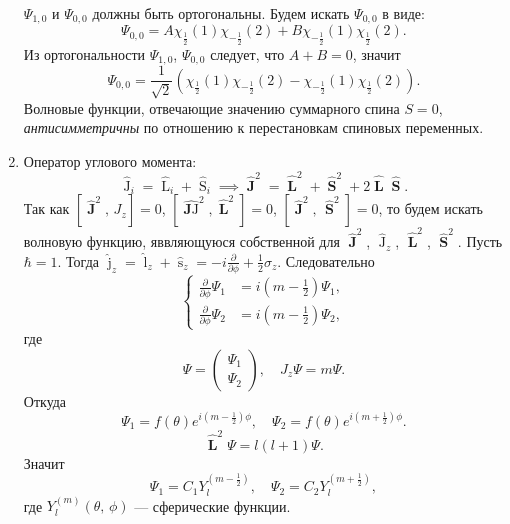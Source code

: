 \documentclass[a4paper]{article}
\begin{document}
\begin{sol}
\begin{enumerate}
$\Psi_{1,0}$ и $\Psi_{0,0}$ должны быть
ортогональны. Будем искать $\Psi_{0,0}$ в виде:
\[
	\Psi_{0,0}= A \chi_{\frac{1}{2}}(1)\chi_{-\frac{1}{2}}(2)+B\chi_{-\frac{1}{2}}(1)\chi_{\frac{1}{2}}(2)
.\] 
Из ортогональности $\Psi_{1,0}$, $\Psi_{0,0}$ 
следует, что $A+B=0$, значит
\[
	\Psi_{0,0}= \frac{1}{\sqrt{2} } \left( 
	\chi_{\frac{1}{2}}(1) \chi_{-\frac{1}{2}}(2) -\chi_{-\frac{1}{2}}(1) \chi_{\frac{1}{2}}(2)\right) 
.\] 
Волновые функции, отвечающие значению суммарного
спина $S=0$, \emph{антисимметричны} по отношению
к перестановкам  спиновых переменных.
\item Оператор углового момента:
	\[
	\widehat{\operatorname{J}}_i= \widehat{\operatorname{L}}_i +\widehat{\operatorname{S}}_i\implies
	\widehat{\operatorname{\mathbf{J}}}^2=
	\widehat{\operatorname{\mathbf{L}}}^2+
	\widehat{\operatorname{\mathbf{S}}}^2+
	2 \widehat{\operatorname{\mathbf{L}}}
	\widehat{\operatorname{\mathbf{S}}}
	.\] 
	Так как $\left[ \widehat{\operatorname{\mathbf{J}}}^2,\,J_z \right] =0$, $\left[ \widehat{\operatorname{\mathbf{J}J}}^2,
	\widehat{\operatorname{\mathbf{L}}}^2\right] =0$,
	$\left[ \widehat{\operatorname{\mathbf{J}}}^2,\,
	\widehat{\operatorname{\mathbf{S}}}^2\right] =0$,
	то будем искать волновую функцию, яввляющуюся
	собственной для $\widehat{\operatorname{\mathbf{J}}}^2$, $
	\widehat{\operatorname{J}}_z$, $
	\widehat{\operatorname{\mathbf{L}}}^2$,
	$\widehat{\operatorname{\mathbf{S}}}^2$.
Пусть $\hbar =1$. Тогда $\widehat{\operatorname{j}}_z= \widehat{\operatorname{l}}_z+ \widehat{\operatorname{s}}_z= - i \frac{\partial }{\partial \phi} + \frac{1}{2}\sigma_z$. Следовательно
\[
\left\{
\begin{aligned}
	\frac{\partial }{\partial \phi} \Psi_1&=i \left( 
	m-\frac{1}{2}\right) \Psi_1,\\
		\frac{\partial }{\partial \phi} \Psi_2&=
	i\left( m-\frac{1}{2} \right) \Psi_2,
\end{aligned}
\right.
\] 
где
\[
\Psi= \begin{pmatrix} \Psi_1\\\Psi_2 \end{pmatrix} ,\quad
J_z \Psi =m \Psi
.\] 
Откуда
\[
	\Psi_1= f(\theta) e^{i\left( m-\frac{1}{2} \right) \phi},\quad
	\Psi_2=f(\theta) e^{i \left( m+\frac{1}{2} \right) \phi}
.\] 
\[
	\widehat{\operatorname{\mathbf{L}}}^2 \Psi= l(l+1) \Psi
.\] 
Значит
\[
	\Psi_1= C_1 Y _l^{\left( m-\frac{1}{2} \right) },\quad
	\Psi_2=C_2 Y _l ^{\left( 
	m+\frac{1}{2}\right) },
\]
где $Y_l^{(m)}(\theta,\,\phi)$ --- сферические
функции.


\end{enumerate}
\end{sol}
\end{document}
